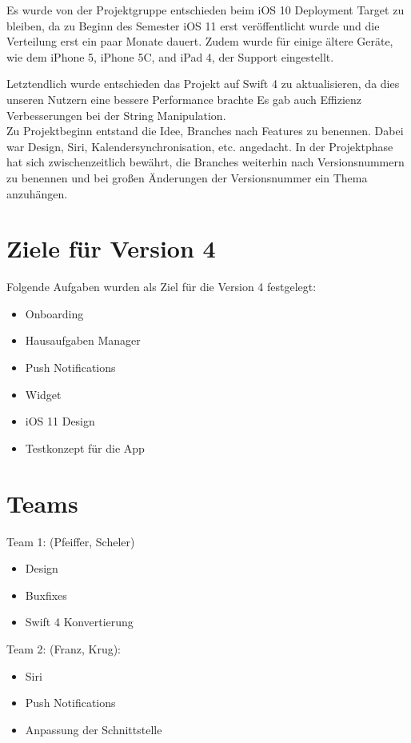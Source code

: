 Es wurde von der Projektgruppe entschieden beim iOS 10 Deployment Target zu bleiben, da zu Beginn des Semester iOS 11 erst veröffentlicht wurde und die Verteilung erst ein paar Monate dauert. Zudem wurde für einige ältere Geräte, wie dem iPhone 5, iPhone 5C, and iPad 4, der Support eingestellt.

Letztendlich wurde entschieden das Projekt auf Swift 4 zu aktualisieren, da dies unseren Nutzern eine bessere Performance brachte Es gab auch Effizienz Verbesserungen bei der String Manipulation.\\

Zu Projektbeginn entstand die Idee, Branches nach Features zu benennen. Dabei war Design, Siri, Kalendersynchronisation, etc. angedacht. In der Projektphase hat sich zwischenzeitlich bewährt, die Branches weiterhin nach Versionsnummern zu benennen und bei großen Änderungen der Versionsnummer ein Thema anzuhängen.


\section{Ziele für Version 4}
Folgende Aufgaben wurden als Ziel für die Version 4 festgelegt:
\begin{itemize}
\item Onboarding
\item Hausaufgaben Manager
\item Push Notifications
\item Widget
\item iOS 11 Design
\item Testkonzept für die App
\end{itemize}


\section{Teams}

Team 1: (Pfeiffer, Scheler)
\begin{itemize}
\item Design
\item Buxfixes
\item Swift 4 Konvertierung
\end{itemize}


Team 2: (Franz, Krug):
\begin{itemize}
\item Siri
\item Push Notifications
\item Anpassung der Schnittstelle
\end{itemize}


